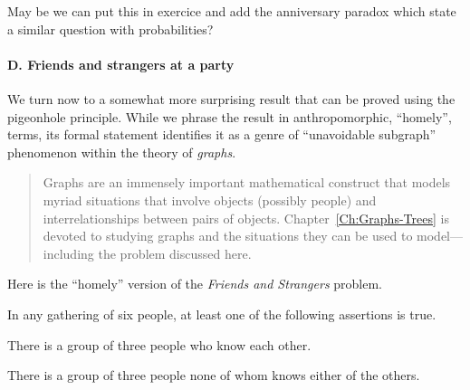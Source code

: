 {\Denis May be we can put this in exercice and add the anniversary paradox which state a similar question with probabilities?}


\paragraph{\small\sf D. Friends and strangers at a party}

We turn now to a somewhat more surprising result that can be proved
using the pigeonhole principle.  While we phrase the result in
anthropomorphic, ``homely'', terms, its formal statement identifies it
as a genre of ``unavoidable subgraph''
%
phenomenon within the theory of {\it graphs}.
\begin{quote}
Graphs are an immensely important mathematical construct that models
myriad situations that involve objects (possibly people) and
interrelationships between pairs of objects.
Chapter~\ref{Ch:Graphs-Trees} is devoted to studying graphs and the
situations they can be used to model---including the problem discussed
here.
\end{quote}
Here is the ``homely'' version of the {\it Friends and Strangers} problem.

\begin{prop}
\label{thm:triangle-cotriangles}
In any gathering of six people, at least one of the following
assertions is true.

There is a group of three people who know each other.

There is a group of three people none of whom knows either of the
others.
\end{prop}

